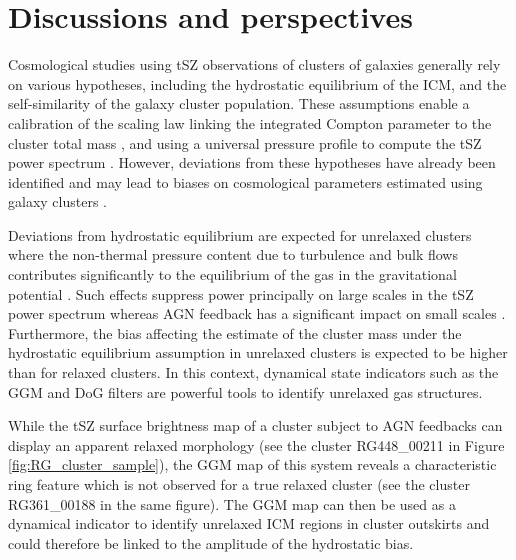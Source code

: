 \documentclass[twocolumn,traditabstract]{aa}
\begin{document}
\section{Discussions and perspectives}\label{sec:discussions}
Cosmological studies using tSZ observations of clusters of galaxies generally rely on various hypotheses, including the hydrostatic equilibrium of the ICM, and the self-similarity of the galaxy cluster population. These assumptions enable a calibration of the scaling law linking the integrated Compton parameter to the cluster total mass \citep[see, e.g,][]{Arnaud2007}, and using a universal pressure profile to compute the tSZ power spectrum \citep[e.g.][]{Komatsu2002}. However, deviations from these hypotheses have already been identified and may lead to biases on cosmological parameters estimated using galaxy clusters \citep[see, e.g.][]{Ichikawa2013,McDonald2014}.

Deviations from hydrostatic equilibrium are expected for unrelaxed clusters where the non-thermal pressure content due to turbulence and bulk flows contributes significantly to the equilibrium of the gas in the gravitational potential \citep[e.g.][]{Siegel2016}. Such effects suppress power principally on large scales in the tSZ power spectrum whereas AGN feedback has a significant impact on small scales \citep[e.g.][]{Shaw2010}. Furthermore, the bias affecting the estimate of the cluster mass under the hydrostatic equilibrium assumption in unrelaxed clusters is expected to be higher than for relaxed clusters. In this context, dynamical state indicators such as the GGM and DoG filters are powerful tools to identify unrelaxed gas structures.

While the tSZ surface brightness map of a cluster subject to AGN feedbacks can display an apparent relaxed morphology (see the cluster RG448\_00211 in Figure \ref{fig:RG_cluster_sample}), the GGM map of this system reveals a characteristic ring feature which is not observed for a true relaxed cluster (see the cluster RG361\_00188 in the same figure). The GGM map can then be used as a dynamical indicator to identify unrelaxed ICM regions in cluster outskirts and could therefore be linked to the amplitude of the hydrostatic bias.
\end{document}
